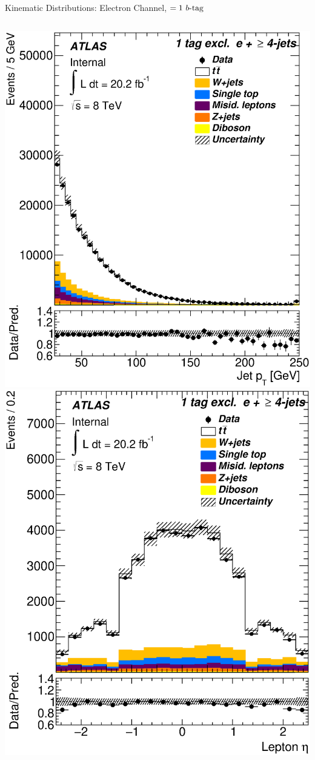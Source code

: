 \documentclass{beamer}
\begin{document}
{\begin{frame}{Kinematic Distributions: Electron Channel, $=1\text{ } \lowercase{ b\text{-tag}}$}
\begin{columns}
      \includegraphics[width=.95\textwidth]{../chapters/whel/figures/control_Plots2/bTag_1excl/JetPt_el}
      \includegraphics[width=.95\textwidth]{../chapters/whel/figures/control_Plots2/bTag_1excl/LeptonEta_el}\\

\end{columns}
\end{frame}}
\end{document}
